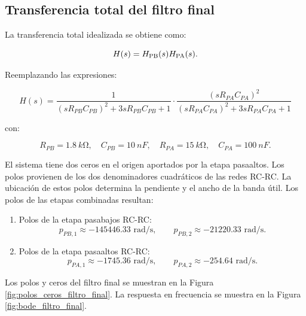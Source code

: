 \subsection{Transferencia total del filtro final}

La transferencia total idealizada se obtiene como:

\begin{equation}
    H(s)=H_{\mathrm{PB}}(s)H_{\mathrm{PA}}(s).
\end{equation}

Reemplazando las expresiones:

\begin{equation}
    \boxed{
    H(s)=
    \frac{1}{(sR_{PB}C_{PB})^2+3sR_{PB}C_{PB}+1}
    \cdot
    \frac{(sR_{PA}C_{PA})^2}{(sR_{PA}C_{PA})^2+3sR_{PA}C_{PA}+1}
    }
\end{equation}

con:

\begin{equation}
    R_{PB}=\SI{1.8}{k\ohm}, \quad C_{PB}=\SI{10}{nF}, \quad
    R_{PA}=\SI{15}{k\ohm}, \quad C_{PA}=\SI{100}{nF}.
\end{equation}

El sistema tiene dos ceros en el origen aportados por la etapa pasaaltos. Los polos provienen de los dos denominadores cuadráticos de las redes RC-RC. La ubicación de estos polos determina la pendiente y el ancho de la banda útil.
Los polos de las etapas combinadas resultan:
\begin{enumerate}
    \item Polos de la etapa pasabajos RC-RC:
    \begin{equation}
        p_{PB,1}\approx -145446.33\text{ rad/s},
        \qquad
        p_{PB,2}\approx -21220.33\text{ rad/s}.
    \end{equation}
    \item Polos de la etapa pasaaltos RC-RC:
    \begin{equation}
        p_{PA,1}\approx -1745.36\text{ rad/s},
        \qquad
        p_{PA,2}\approx -254.64\text{ rad/s}.
    \end{equation}
\end{enumerate}



Los polos y ceros del filtro final se muestran en la Figura \ref{fig:polos_ceros_filtro_final}. La respuesta en frecuencia se muestra en la Figura \ref{fig:bode_filtro_final}.



